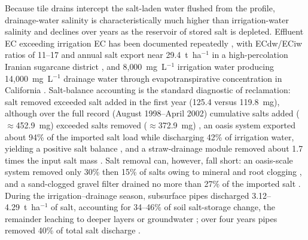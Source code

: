 \documentclass[11pt]{article}
\begin{document}
Because tile drains intercept the salt-laden water flushed from the profile, drainage-water salinity is characteristically much higher than irrigation-water salinity and declines over years as the reservoir of stored salt is depleted. Effluent EC exceeding irrigation EC has been documented repeatedly \parencite{Li2022,Karegoudar2022}, with ECdw/ECiw ratios of 11--17 and annual salt export near 29.4~t~ha$^{-1}$ in a high-percolation Iranian sugarcane district \parencite{Akram2013}, and 8{,}000~mg~L$^{-1}$ irrigation water producing 14{,}000~mg~L$^{-1}$ drainage water through evapotranspirative concentration in California \parencite{KARAJEH1994c}. Salt-balance accounting is the standard diagnostic of reclamation: salt removed exceeded salt added in the first year (125.4 versus 119.8~mg), although over the full record (August 1998--April 2002) cumulative salts added ($\approx$452.9~mg) exceeded salts removed ($\approx$372.9~mg) \parencite{Manjunatha2004}, an oasis system exported about 94\% of the imported salt load while discharging 42\% of irrigation water, yielding a positive salt balance \parencite{Askri2022}, and a straw-drainage module removed about 1.7 times the input salt mass \parencite{Lu2019}. Salt removal can, however, fall short: an oasis-scale system removed only 30\% then 15\% of salts owing to mineral and root clogging \parencite{BenAissa2013}, and a sand-clogged gravel filter drained no more than 27\% of the imported salt \parencite{HajAmor2019}. During the irrigation--drainage season, subsurface pipes discharged 3.12--4.29~t~ha$^{-1}$ of salt, accounting for 34--46\% of soil salt-storage change, the remainder leaching to deeper layers or groundwater \parencite{Liu2025c}; over four years pipes removed 40\% of total salt discharge \parencite{Heng2021}.
\end{document}
